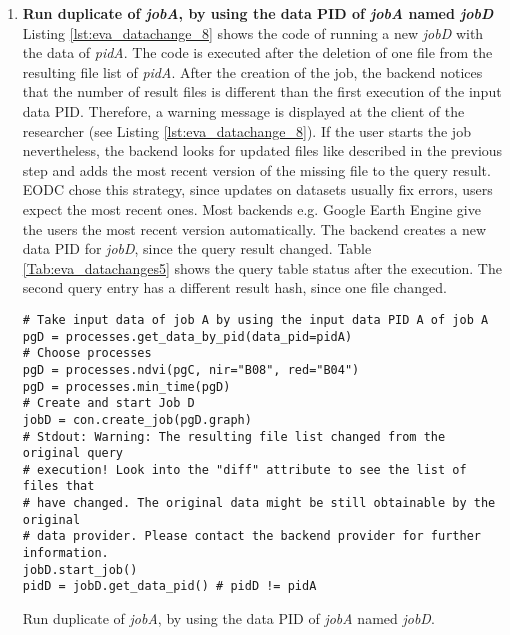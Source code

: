 \documentclass[draft,final]{vutinfth} %
\newenvironment{code}{\captionsetup{type=listing}}{}
\begin{document}
\begin{enumerate}
	\item \textbf{Run duplicate of \textit{jobA}, by using the data PID of \textit{jobA} named \textit{jobD}}\\
	Listing \ref{lst:eva_datachange_8} shows the code of running a new \textit{jobD} with the data of \textit{pidA}. The code is executed after the deletion of one file from the resulting file list of \textit{pidA}. After the creation of the job, the backend notices that the number of result files is different than the first execution of the input data PID. Therefore, a warning message is displayed at the client of the researcher {(see Listing \ref{lst:eva_datachange_8})}. If the user starts the job nevertheless, the backend looks for updated files like described in the previous step and adds the most recent version of the missing file to the query result. {EODC chose this strategy, since updates on datasets usually fix errors, users expect the most recent ones. Most backends e.g. Google Earth Engine give the users the most recent version automatically.} The backend creates a new data PID for \textit{jobD}, since the query result changed. Table \ref{Tab:eva_datachanges5} shows the query table status after the execution. The second query entry has a different result hash, since one file changed. 
	\newpage
	\begin{code}
		\begin{verbatim}
# Take input data of job A by using the input data PID A of job A
pgD = processes.get_data_by_pid(data_pid=pidA)
# Choose processes
pgD = processes.ndvi(pgC, nir="B08", red="B04")
pgD = processes.min_time(pgD)
# Create and start Job D
jobD = con.create_job(pgD.graph)
# Stdout: Warning: The resulting file list changed from the original query
# execution! Look into the "diff" attribute to see the list of files that
# have changed. The original data might be still obtainable by the original 
# data provider. Please contact the backend provider for further information.
jobD.start_job()
pidD = jobD.get_data_pid() # pidD != pidA
		\end{verbatim}
		\caption{Run duplicate of \textit{jobA}, by using the data PID of \textit{jobA} named \textit{jobD}.}
		\label{lst:eva_datachange_8}
	\end{code}


\end{enumerate}
\end{document}
